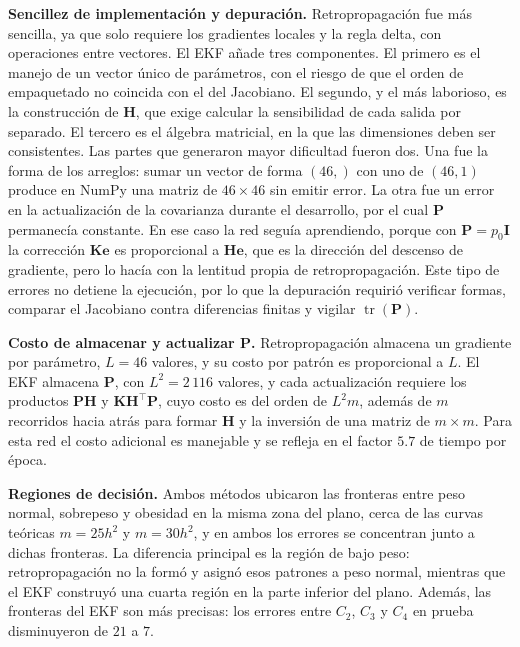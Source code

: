 \documentclass[conference]{IEEEtran}
\begin{document}
\textbf{Sencillez de implementación y depuración.} Retropropagación fue más
sencilla, ya que solo requiere los gradientes locales y la regla delta, con
operaciones entre vectores. El EKF añade tres componentes. El primero es el
manejo de un vector único de parámetros, con el riesgo de que el orden de
empaquetado no coincida con el del Jacobiano. El segundo, y el más
laborioso, es la construcción de $\mathbf{H}$, que exige calcular la
sensibilidad de cada salida por separado. El tercero es el álgebra
matricial, en la que las dimensiones deben ser consistentes. Las partes que
generaron mayor dificultad fueron dos. Una fue la forma de los arreglos:
sumar un vector de forma $(46,)$ con uno de $(46,1)$ produce en NumPy una
matriz de $46\times46$ sin emitir error. La otra fue un error en la
actualización de la covarianza durante el desarrollo, por el cual
$\mathbf{P}$ permanecía constante. En ese caso la red seguía aprendiendo,
porque con $\mathbf{P}=p_0\mathbf{I}$ la corrección
$\mathbf{K}\mathbf{e}$ es proporcional a $\mathbf{H}\mathbf{e}$, que es la
dirección del descenso de gradiente, pero lo hacía con la lentitud propia
de retropropagación. Este tipo de errores no detiene la ejecución, por lo
que la depuración requirió verificar formas, comparar el Jacobiano contra
diferencias finitas y vigilar $\operatorname{tr}(\mathbf{P})$.

\textbf{Costo de almacenar y actualizar $\mathbf{P}$.} Retropropagación
almacena un gradiente por parámetro, $L=46$ valores, y su costo por patrón
es proporcional a $L$. El EKF almacena $\mathbf{P}$, con $L^2=2\,116$
valores, y cada actualización requiere los productos
$\mathbf{P}\mathbf{H}$ y $\mathbf{K}\mathbf{H}^\top\mathbf{P}$, cuyo costo
es del orden de $L^2m$, además de $m$ recorridos hacia atrás para formar
$\mathbf{H}$ y la inversión de una matriz de $m\times m$. Para esta red el
costo adicional es manejable y se refleja en el factor $5.7$ de tiempo por
época.

\textbf{Regiones de decisión.} Ambos métodos ubicaron las fronteras entre
peso normal, sobrepeso y obesidad en la misma zona del plano, cerca de las
curvas teóricas $m=25h^2$ y $m=30h^2$, y en ambos los errores se concentran
junto a dichas fronteras. La diferencia principal es la región de bajo
peso: retropropagación no la formó y asignó esos patrones a peso normal,
mientras que el EKF construyó una cuarta región en la parte inferior del
plano. Además, las fronteras del EKF son más precisas: los errores entre
$C_2$, $C_3$ y $C_4$ en prueba disminuyeron de $21$ a $7$.
\end{document}

